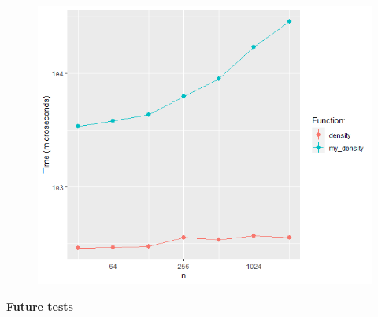 \begin{frame}
\begin{columns}
\begin{column}{0.48\textwidth}
			\begin{figure}[h]
				\centering
				\includegraphics[width=1\linewidth]{../images/runtime_dens}
				\caption{}
				\label{fig:runtimedens}
			\end{figure}
		

			\textbf{Future tests}\\
		\end{column}
	\end{columns}
\end{frame}







